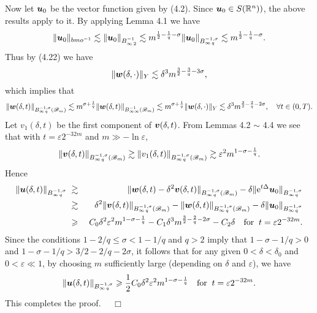 \documentclass[11pt]{article}
\newcommand{\bfu}{{\mbox{\boldmath $u$}}}
\newcommand{\bfv}{{\mbox{\boldmath $v$}}}
\newcommand{\bfw}{{\mbox{\boldmath $w$}}}
\newcommand{\rme}{{\rm e}}
\begin{document}
  Now let $\bfu_0$ be the vector function given by (4.2). Since $\bfu_0\in S(\mathbb{R}^n))$, the above results apply to it. By applying Lemma 4.1 we
  have
\begin{equation}
  \|\bfu_0\|_{bmo^{-1}}\lesssim\|\bfu_0\|_{B^{-1}_{\infty\,2}}\lesssim m^{\frac{1}{2}-\frac{1}{q}-\sigma}\|\bfu_0\|_{B^{-1,\sigma}_{\infty\,q}}
  \lesssim m^{\frac{1}{2}-\frac{1}{q}-\sigma}.
\end{equation}
  Thus by (4.22) we have
\begin{equation}
  \|\bfw(\delta,\cdot)\|_Y\lesssim\delta^3 m^{\frac{3}{2}-\frac{3}{q}-3\sigma},
\end{equation}
  which implies that
\begin{equation}
  \|\bfw(\delta,t)\|_{B^{-1,\sigma}_{\infty\,q}(\mathscr{B}_m)}\lesssim m^{\sigma+\frac{1}{q}}
  \|\bfw(\delta,t)\|_{B^{-1}_{\infty\infty}(\mathscr{B}_m)}\lesssim m^{\sigma+\frac{1}{q}}\|\bfw(\delta,\cdot)\|_Y
  \lesssim\delta^3 m^{\frac{3}{2}-\frac{2}{q}-2\sigma}, \quad \forall t\in (0,T).
\end{equation}
  Let $v_1(\delta,t)$ be the first component of $\bfv(\delta,t)$. From Lemmas 4.2 $\sim$ 4.4 we see that with $t=\varepsilon 2^{-32m}$ and
  $m\gg-\ln\varepsilon$,
$$
  \|\bfv(\delta,t)\|_{B^{-1,\sigma}_{\infty\,q}(\mathscr{B}_m)}\gtrsim\|v_1(\delta,t)\|_{B^{-1,\sigma}_{\infty\,q}(\mathscr{B}_m)}
  \gtrsim\varepsilon^2 m^{1-\sigma-\frac{1}{q}}.
$$
  Hence
\begin{eqnarray}
  \|\bfu(\delta,t)\|_{B^{-1,\sigma}_{\infty\,q}}&\;\gtrsim\;&\|\bfw(\delta,t)-\delta^2\bfv(\delta,t)\|_{B^{-1,\sigma}_{\infty\,q}(\mathscr{B}_m)}
  -\delta\|\rme^{t\Delta}\bfu_0\|_{B^{-1,\sigma}_{\infty\,q}}
\nonumber\\
  &\;\gtrsim\;&\delta^2\|\bfv(\delta,t)\|_{B^{-1,\sigma}_{\infty\,q}(\mathscr{B}_m)}-\|\bfw(\delta,t)\|_{B^{-1,\sigma}_{\infty\,q}(\mathscr{B}_m)}
  -\delta\|\bfu_0\|_{B^{-1,\sigma}_{\infty\,q}}
\nonumber\\
  &\;\geqslant\;& C_0\delta^2\varepsilon^2 m^{1-\sigma-\frac{1}{q}}-C_1\delta^3 m^{\frac{3}{2}-\frac{2}{q}-2\sigma}-C_2\delta
  \quad \mbox{for}\;\; t=\varepsilon 2^{-32m}.
\end{eqnarray}
  Since the conditions $1-2/q\leqslant\sigma<1-1/q$ and $q>2$ imply that $1-\sigma-1/q>0$ and $1-\sigma-1/q>3/2-2/q-2\sigma$, it follows that for any
  given $0<\delta<\delta_0$ and $0<\varepsilon\ll 1$, by choosing $m$ sufficiently large (depending on $\delta$ and $\varepsilon$), we have
$$
  \|\bfu(\delta,t)\|_{B^{-1,\sigma}_{\infty\,q}}\geqslant\frac{1}{2}C_0\delta^2\varepsilon^2 m^{1-\sigma-\frac{1}{q}}
  \quad \mbox{for}\;\; t=\varepsilon 2^{-32m}.
$$
  This completes the proof. $\quad\Box$
\medskip
\end{document}
